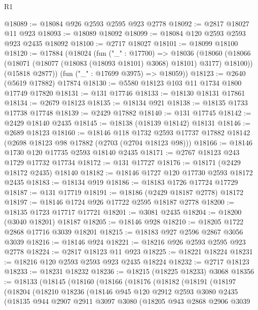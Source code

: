 \begin{lexlean}{R1}
\begin{coremodule}
@18089 := @18084 @926 @2593 @2595 @923 @2778
@18092 := @2817 @18027 @11 @923
@18093 := @18089 @18092
@18099 := @18084 @120 @2593 @2593 @923 @2435 @18092
@18100 := @2717 @18027
@18101 := @18099 @18100
@18120 := @17884
    (@18024
      (fun ("_" : @17700) =>
      @18036
        (@18060 (@18066 (@18071 (@18077 (@18083 (@18093 @18101) @3068) @18101) @3177) @18100))
        (@15818 @2877))
      (fun ("_" : @17699 @3975) => @18059))
@18123 := @2640 (@5619 @17882) @17874
@18130 := @5580 @18123 @103 @11 @1734 @1800 @17749 @17820
@18131 := @131 @17746
@18133 := @18130 @18131 @17861
@18134 := @2679 @18123
@18135 := @18134 @921
@18138 := @18135 @1733 @17738 @17748
@18139 := @2429 @17882
@18140 := @131 @17745
@18142 := @2429 @18140 @2435
@18145 := @18138 (@18139 @18142) @18131
@18146 := @2689 @18123
@18160 := @18146
    @118
    @1732
    @2593
    @17737
    @17882
    @18142
    (@2698 @18123 @98 @17882 (@2703 (@2704 @18123 @98)))
@18166 := @18146 @1730 @120 @17735 @2593 @18140 @2435
@18171 := @2767 @18123 @243 @1729 @17732 @17734
@18172 := @131 @17727
@18176 := @18171 (@2429 @18172 @2435) @18140
@18182 := @18146 @1727 @120 @17730 @2593 @18172 @2435
@18183 := @18134 @919
@18186 := @18183 @1726 @17724 @17729
@18187 := @131 @17719
@18191 := @18186 (@2429 @18187 @2778) @18172
@18197 := @18146 @1724 @926 @17722 @2595 @18187 @2778
@18200 := @18135 @1723 @17717 @17721
@18201 := @3081 @2435
@18204 := @18200 (@3040 @18201) @18187
@18205 := @18146 @928
@18210 := @18205 @1722 @2868 @17716 @3039 @18201
@18215 := @18183 @927 @2596 @2867 @3056 @3039
@18216 := @18146 @924
@18221 := @18216 @926 @2593 @2595 @923 @2778
@18224 := @2817 @18123 @11 @923
@18225 := @18221 @18224
@18231 := @18216 @120 @2593 @2593 @923 @2435 @18224
@18232 := @2717 @18123
@18233 := @18231 @18232
@18236 := @18215 (@18225 @18233) @3068
@18356 := @18133
    (@18145
      (@18160
        (@18166
          (@18176
            (@18182
              (@18191
                (@18197
                  (@18204
                    (@18210
                      @18236
                      (@18146
                        @945
                        @120
                        @2912
                        @2593
                        @3080
                        @2435
                        (@18135
                          @944
                          @2907
                          @2911
                          @3097
                          @3080
                          (@18205
                            @943
                            @2868
                            @2906
                            @3039

\end{coremodule}
\end{lexlean}
